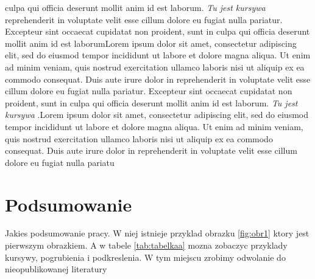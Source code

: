 \documentclass[12pt,a4paper,titlepage]{article}
\begin{document}
culpa qui officia deserunt mollit anim id est laborum.  \textit{Tu jest kursywa} reprehenderit in voluptate velit esse cillum dolore eu fugiat nulla pariatur. Excepteur sint occaecat cupidatat non proident, sunt in culpa qui officia deserunt mollit anim id est laborumLorem ipsum dolor sit amet, consectetur adipiscing elit, sed do eiusmod tempor incididunt ut labore et dolore magna aliqua.  Ut enim ad minim veniam, quis nostrud exercitation ullamco laboris nisi ut aliquip ex ea commodo consequat. Duis aute irure dolor in reprehenderit in voluptate velit esse cillum dolore eu fugiat nulla pariatur. Excepteur sint occaecat cupidatat non proident, sunt in culpa qui officia deserunt mollit anim id est laborum.  \textit{Tu jest kursywa} .Lorem ipsum dolor sit amet, consectetur adipiscing elit, sed do eiusmod tempor incididunt ut labore et dolore magna aliqua. Ut enim ad minim veniam, quis nostrud exercitation ullamco laboris nisi ut aliquip ex ea commodo consequat. Duis aute irure dolor in reprehenderit in voluptate velit esse cillum dolore eu fugiat nulla pariatu \cite{ksiazka1}




\section{Podsumowanie}

Jakies podsumowanie pracy. W niej istnieje przyklad obrazku  \ref{fig:obr1} ktory jest pierwszym obrazkiem. A w tabele \ref{tab:tabelkaa}  mozna zobaczyc przyklady kursywy, pogrubienia i podkreslenia. W tym miejscu zrobimy odwolanie do nieopublikowanej literatury \cite{nieopublikowana1}

\nocite{*}


\end{document}
